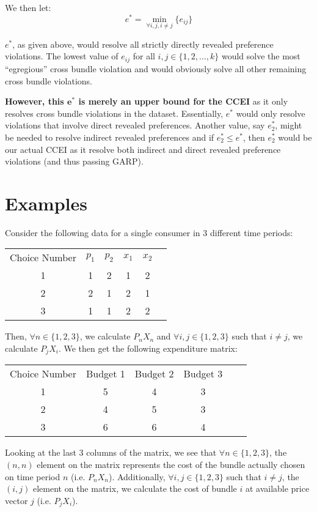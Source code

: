 \documentclass{article} %
\begin{document}
We then let:
$$e^{*}=\min_{\forall i,j, i\not=j}\{e_{ij}\}$$

$e^{*}$, as given above, would resolve all strictly directly revealed preference violations. The lowest value of $e_{ij}$ for all $i,j\in\{1,2,\ldots,k\}$ would solve the most ``egregious'' cross bundle violation and would obviously solve all other remaining cross bundle violations.


\textbf{However, this $\mathbf{e^*}$ is merely an upper bound for the CCEI} as it only resolves cross bundle violations in the dataset. Essentially, $e^*$ would only resolve violations that involve direct revealed preferences. Another value, say $e^*_{2}$, might be needed to resolve indirect revealed preferences and if $e^*_{2}\leq e^*$, then $e^*_{2}$ would be our actual CCEI as it resolve both indirect and direct revealed preference violations (and thus passing GARP). 

\section{Examples}

Consider the following data for a single consumer in 3 different time periods:

\begin{center}
\begin{tabular}{ cccccc } 
Choice Number & $p_{1}$ & $p_{2}$ & $x_{1}$ & $x_{2}$ \\
1&1&2&1&2 \\
2&2&1&2&1 \\
3&1&1&2&2
\end{tabular}
\end{center}

Then, $\forall n\in\{1,2,3\}$, we calculate $P_{n}X_{n}$ and $\forall i,j\in\{1,2,3\}$ such that $i\not=j$, we calculate $P_{j}X_{i}$. We then get the following expenditure matrix:

\begin{center}
\begin{tabular}{ cccccc } 
Choice Number & Budget 1 & Budget 2 & Budget 3 \\
1&5&4&3 \\
2&4&5&3 \\
3&6&6&4
\end{tabular}
\end{center}

Looking at the last 3 columns of the matrix, we see that $\forall n\in\{1,2,3\}$, the $(n,n)$ element on the matrix represents the cost of the bundle actually chosen on time period $n$ (i.e. $P_{n}X_{n}$). Additionally, $\forall i,j\in\{1,2,3\}$ such that $i\not=j$, the $(i,j)$ element on the matrix, we calculate the cost of bundle $i$ at available price vector $j$ (i.e. $P_{j}X_{i}$).
\bigskip
\end{document}
